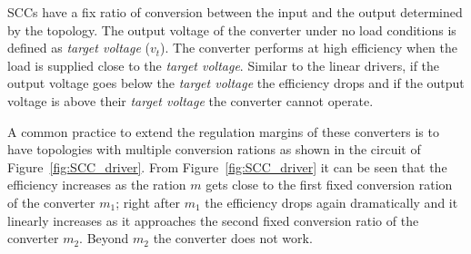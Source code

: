 SCCs have a fix ratio of conversion between the input and the output determined by the topology. The output voltage of the converter under no load conditions is defined as \emph{target voltage} ($v_t$). The converter performs at high efficiency when the load is supplied close to the \emph{target voltage}. Similar to the linear drivers, if the output voltage goes below the \emph{target voltage} the efficiency drops and if the output voltage is above their \emph{target voltage} the converter cannot operate.

A common practice to extend the regulation margins of these converters is to have topologies with multiple conversion rations as shown in the circuit of Figure~\ref{fig:SCC_driver}. From Figure~\ref{fig:SCC_driver} it can be seen that the efficiency increases as the ration $m$ gets close to the first fixed conversion ration of the converter $m_1$; right after $m_1$ the efficiency drops again dramatically and it linearly increases as it approaches the second fixed conversion ratio of the converter $m_2$. Beyond $m_2$ the converter does not work.

